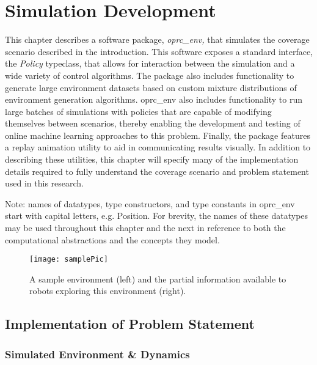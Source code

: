 \chapter{Simulation Development}

This chapter describes a software package, \textit{oprc\_env,} that simulates the coverage scenario described in the introduction. This software exposes a standard interface, the \textit{Policy} typeclass, that allows for interaction between the simulation and a wide variety of control algorithms. The package also includes functionality to generate large environment datasets based on custom mixture distributions of environment generation algorithms. oprc\_env also includes functionality to run large batches of simulations with policies that are capable of modifying themselves between scenarios, thereby enabling the development and testing of online machine learning approaches to this problem. Finally, the package features a replay animation utility to aid in communicating results visually. In addition to describing these utilities, this chapter will specify many of the implementation details required to fully understand the coverage scenario and problem statement used in this research.

Note: names of datatypes, type constructors, and type constants in oprc\_env start with capital letters, e.g. Position. For brevity, the names of these datatypes may be used throughout this chapter and the next in reference to both the computational abstractions and the concepts they model.


\begin{figure}[H]
\texttt{[image: samplePic]}
\caption[Sample Environment Visualization]{A sample environment (left) and the partial information available to robots exploring this environment (right).}
\label {fig:SampleViz}
\end{figure}

\section{Implementation of Problem Statement}

\subsection{Simulated Environment \& Dynamics}

